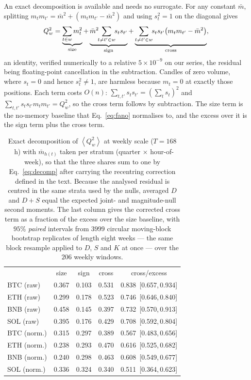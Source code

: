 \documentclass[aps,pre,twocolumn,superscriptaddress,floatfix,nofootinbib]{revtex4-2}
\newcommand{\avg}[1]{\left\langle #1 \right\rangle}
\begin{document}
An exact decomposition is available and needs no surrogate. For any constant
$\bar m$, splitting $m_t m_{t'}=\bar m^2+(m_t m_{t'}-\bar m^2)$ and using
$s_t^2=1$ on the diagonal gives
\begin{equation}
  Q_w^2=\underbrace{\sum_{t\in w}m_t^2}_{\rm size}
   +\underbrace{\bar m^{2}\!\!\sum_{t\neq t'\in w}\!\!s_t s_{t'}}_{\rm sign}
   +\underbrace{\sum_{t\neq t'\in w}\!\!s_t s_{t'}
     \bigl(m_t m_{t'}-\bar m^{2}\bigr)}_{\rm cross} ,
  \label{eq:decomp}
\end{equation}
an identity, verified numerically to a relative $5\times10^{-9}$ on our series,
the residual being floating-point cancellation in the subtraction. Candles of
zero volume, where $s_t=0$ and hence $s_t^2\neq1$, are harmless because $m_t=0$
at exactly those positions. Each term costs $O(n)$: $\sum_{t,t'}s_ts_{t'}=
(\sum_t s_t)^2$ and $\sum_{t,t'}s_ts_{t'}m_tm_{t'}=Q_w^2$, so the cross term
follows by subtraction. The size term is the no-memory baseline that
Eq.~\eqref{eq:fano} normalises to, and the excess over it is the sign term plus
the cross term.

\begin{table}[t]
  \caption{Exact decomposition of $\avg{Q_w^2}$ at weekly scale ($T=168$~h)
  with $\bar m_{h(t)}$ taken per stratum (quarter $\times$ hour-of-week), so
  that the three shares sum to one by Eq.~\eqref{eq:decomp} after carrying the
  recentring correction defined in the text. Because the analysed residual is
  centred in the same strata used by the nulls, averaged $D$ and $D{+}S$ equal
  the expected joint- and magnitude-null second moments. The last
  column gives the corrected cross term as a
  fraction of the excess over the size baseline, with $95\%$ \emph{paired}
  intervals from $3999$ circular moving-block bootstrap replicates of length
  eight weeks --- the same block resample applied to $D$, $S$ and $K$ at once
  --- over the $206$ weekly windows.}
  \label{tab:decomp}
  \begin{ruledtabular}
  \begin{tabular}{lcccc}
   & size & sign & cross & cross/excess \\
  \colrule
  BTC (raw)  & 0.367 & 0.103 & 0.531 & 0.838\ [0.657,\,0.934] \\
  ETH (raw)  & 0.299 & 0.178 & 0.523 & 0.746\ [0.646,\,0.840] \\
  BNB (raw)  & 0.458 & 0.145 & 0.397 & 0.732\ [0.570,\,0.913] \\
  SOL (raw)  & 0.395 & 0.176 & 0.429 & 0.708\ [0.592,\,0.804] \\
  \colrule
  BTC (norm.)& 0.315 & 0.297 & 0.389 & 0.567\ [0.483,\,0.656] \\
  ETH (norm.)& 0.238 & 0.293 & 0.470 & 0.616\ [0.525,\,0.682] \\
  BNB (norm.)& 0.240 & 0.298 & 0.463 & 0.608\ [0.549,\,0.677] \\
  SOL (norm.)& 0.336 & 0.324 & 0.340 & 0.511\ [0.364,\,0.623] \\
  \end{tabular}
  \end{ruledtabular}
\end{table}
\end{document}
